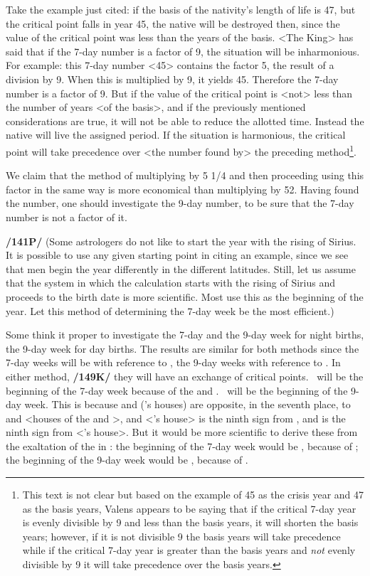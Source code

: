 Take the example just cited: if the basis of the nativity’s length of life is 47, but the critical point falls in year 45, the native will be destroyed then, since the value of the critical point was less than the years of the basis. <The King> has said that if the 7-day number is a factor of 9, the situation will be inharmonious. For example: this 7-day number <45> contains the factor 5, the result of a division by
9. When this is multiplied by 9, it yields 45. Therefore the 7-day number is a factor of 9. But if the value of the critical point is <not> less than the number of years <of the basis>, and if the previously mentioned considerations are true, it will not be able to reduce the allotted time. Instead the native will live the assigned period. If the situation is harmonious, the critical point will take precedence over <the
number found by> the preceding method\footnote{This text is not clear but based on the example of 45 as the crisis year and 47 as the basis years, Valens appears to be saying that if the critical 7-day year is evenly divisible by 9 and less than the basis years, it will shorten the basis years; however, if it is not divisible 9 the basis years will take precedence while if the critical 7-day year is greater than the basis years and \textsl{not} evenly divisible by 9 it will take precedence over the basis years.}.

We claim that the method of multiplying by 5 1/4 and then proceeding using this factor in the same way is more economical than multiplying by 52. Having found the number, one should investigate the 9-day number, to be sure that the 7-day number is not a factor of it.

\textbf{/141P/} (Some astrologers do not like to start the year with the rising of Sirius. It is possible to use any given starting point in citing an example, since we see that men begin the year differently in the different latitudes. Still, let us assume that the system in which the calculation starts with the rising of Sirius and proceeds to the birth date is more scientific. Most use this as the beginning of the year. Let this method of determining the 7-day week be the most efficient.)

Some think it proper to investigate the 7-day and the 9-day week for night births, the 9-day week for day births. The results are similar for both methods since the 7-day weeks will be with reference to \Mars, the 9-day weeks with reference to \Saturn. In either method, \textbf{/149K/} they will have an exchange of critical points. \Saturn\, will be the beginning of the 7-day week because of the \Sun\xspace and \Moon. \Mars\, will be the beginning of the 9-day week. This is because \Capricorn\xspace and \Aquarius\xspace (\Saturn’s houses) are opposite, in the seventh place, to \Cancer\xspace and \Leo\xspace <houses of the \Sun\xspace and \Moon>, and \Aries\xspace <\Mars’s house> is the ninth sign from \Leo, and \Cancer\xspace is the ninth sign from \Scorpio\xspace <\Mars’s house>. But it would be more scientific to derive these from the exaltation of the \Moon\xspace in \Taurus: the beginning of the 7-day week would be \Mars, because of \Scorpio; the beginning of the 9-day week would be \Saturn, because of \Capricorn.

